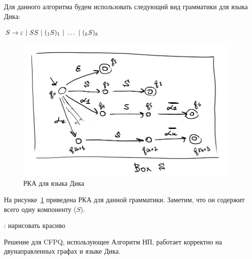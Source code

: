 \begin{note}    
  Для данного алгоритма будем использовать следующий вид грамматики для языка Дика:

  $S \rightarrow \varepsilon~|~SS~|~(_1 S )_1~|~ \dots ~|~(_k S )_k$

  \begin{figure}[H]
      \includegraphics[width=0.75\linewidth]{img/dyck_box}
      \caption{РКА для языка Дика}
      \label{img:dyck_rsm}
  \end{figure}

  На рисунке~\ref{img:dyck_rsm} приведена РКА для данной грамматики. Заметим, что он содержит всего одну компоненту ($S$).

  \TODO: нарисовать красиво

\end{note}


\begin{theorem}
  Решение для CFPQ, использующее Алгоритм НП, работает корректно на двунаправленных графах и языке Дика.
\end{theorem}

